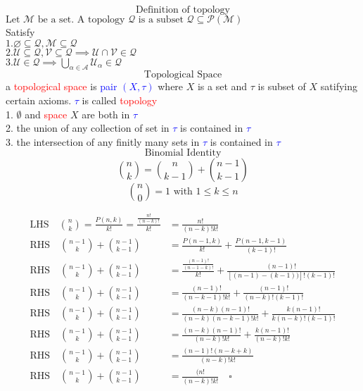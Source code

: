 \documentclass[10pt]{article}
\begin{document}
\newpage
\noindent
\[\text{Definition of topology}\]
$\text{Let }\mathcal{M} \text{ be a set. A topology }\mathcal{Q} \text{ is a subset } \mathcal{Q} \subseteq \mathcal{P}(\mathcal{M})$\\
Satisfy\\
$1. \varnothing\subseteq \mathcal{Q}, \mathcal{M} \subseteq \mathcal{Q}$\\
$2. \mathcal{U} \subseteq \mathcal{Q},   \mathcal{V} \subseteq \mathcal{Q} \implies \mathcal{U} \cap \mathcal{V} \in \mathcal{Q}$\\
$3. \mathcal{U} \in \mathcal{Q} \implies \bigcup_{\alpha \in \mathcal{A}} \mathcal{U}_\alpha \in \mathcal{Q}$\\

\noindent
\[\text{Topological Space}\]
a \textcolor{red}{topological space} is \textcolor{blue}{pair $(X, \tau)$} where $X$ is a set and $\tau$ is subset of $X$ satifying certain axioms. \textcolor{blue}{$\tau$} is called \textcolor{red}{topology}\\
1. $\emptyset$ and \textcolor{red}{space} $X$ are both in \textcolor{blue}{$\tau$}\\
2. the union of any collection of set in \textcolor{blue}{$\tau$} is contained in \textcolor{blue}{$\tau$}\\
3. the intersection of any finitly many sets in \textcolor{blue}{$\tau$} is contained in \textcolor{blue}{$\tau$}\\

\[ \text{Binomial Identity} \] 
\[  \binom{n}{k} = \binom{n}{k-1} + \binom{n-1}{k-1} \] 
\[ \binom{n}{0} = 1 \text{ with } 1 \leq k \leq n\] 

\begin{equation}
\begin{aligned}
    \text{LHS} \quad \binom{n}{k} = \frac{P(n, k)}{k!} = \frac{\frac{n!}{(n-k)!}}{k!} &= \frac{n!}{(n-k)! k!}\\
    \text{RHS} \quad \binom{n-1}{k} + \binom{n-1}{k-1} &= \frac{P(n-1, k)}{k!} + \frac{P(n-1, k-1)}{(k-1)!}  \\  
    \text{RHS} \quad \binom{n-1}{k} + \binom{n-1}{k-1} &= \frac{\frac{(n-1)!}{(n-1-k)!}}{k!} + \frac{(n-1)!}{[(n-1)-(k-1))]!(k-1)!}\\    
    \text{RHS} \quad \binom{n-1}{k} + \binom{n-1}{k-1} &= \frac{(n-1)!}{(n-k-1)!k!} + \frac{(n-1)!}{(n-k)!(k-1)!}\\    
    \text{RHS} \quad \binom{n-1}{k} + \binom{n-1}{k-1} &= \frac{(n-k)(n-1)!}{(n-k)(n-k-1)!k!} + \frac{k(n-1)!}{k(n-k)!(k-1)!}\\    
    \text{RHS} \quad \binom{n-1}{k} + \binom{n-1}{k-1} &= \frac{(n-k)(n-1)!}{(n-k)!k!} + \frac{k(n-1)!}{(n-k)!k!}\\    
    \text{RHS} \quad \binom{n-1}{k} + \binom{n-1}{k-1} &= \frac{(n-1)!(n-k+k)}{(n-k)!k!}\\    
    \text{RHS} \quad \binom{n-1}{k} + \binom{n-1}{k-1} &= \frac{(n!}{(n-k)!k!} \nonumber \quad \square\\    
\end{aligned}
\end{equation}
\end{document}
